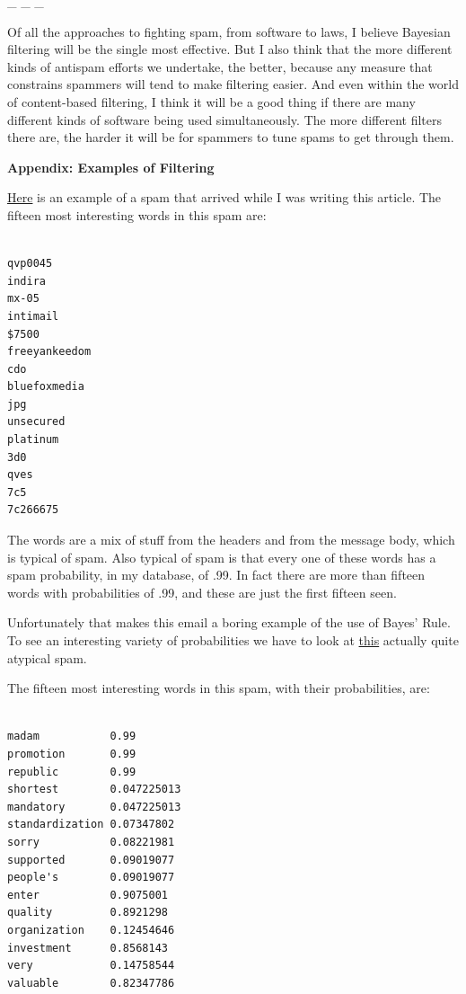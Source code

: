 \_ \_ \_

Of all the approaches to fighting spam, from software to laws, I believe
Bayesian filtering will be the single most effective. But I also think
that the more different kinds of antispam efforts we undertake, the
better, because any measure that constrains spammers will tend to make
filtering easier. And even within the world of content-based filtering,
I think it will be a good thing if there are many different kinds of
software being used simultaneously. The more different filters there
are, the harder it will be for spammers to tune spams to get through
them.

\textbf{Appendix: Examples of Filtering}

\href{https://sep.turbifycdn.com/ty/cdn/paulgraham/spam1.txt?t=1688221954&}{Here}
is an example of a spam that arrived while I was writing this article.
The fifteen most interesting words in this spam are:

\begin{verbatim}

qvp0045
indira
mx-05
intimail
$7500
freeyankeedom
cdo
bluefoxmedia
jpg
unsecured
platinum
3d0
qves
7c5
7c266675
\end{verbatim}

The words are a mix of stuff from the headers and from the message body,
which is typical of spam. Also typical of spam is that every one of
these words has a spam probability, in my database, of .99. In fact
there are more than fifteen words with probabilities of .99, and these
are just the first fifteen seen.

Unfortunately that makes this email a boring example of the use of
Bayes' Rule. To see an interesting variety of probabilities we have to
look at
\href{https://sep.turbifycdn.com/ty/cdn/paulgraham/spam2.txt?t=1688221954&}{this}
actually quite atypical spam.

The fifteen most interesting words in this spam, with their
probabilities, are:

\begin{verbatim}

madam           0.99
promotion       0.99
republic        0.99
shortest        0.047225013
mandatory       0.047225013
standardization 0.07347802
sorry           0.08221981
supported       0.09019077
people's        0.09019077
enter           0.9075001
quality         0.8921298
organization    0.12454646
investment      0.8568143
very            0.14758544
valuable        0.82347786 
\end{verbatim}

